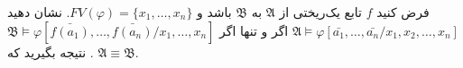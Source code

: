فرض کنید
$f$
تابع یک‌ریختی از 
$\mathfrak{A}$
به 
$\mathfrak{B}$
باشد و 
$FV(\varphi) = \{x_{1},\dots, x_{n}\}$.
نشان دهید
$\mathfrak{A}\models\varphi[\bar{a_1}, \dots, \bar{a_n} / x_{1},x_{2},\dots, x_{n}]$
اگر و تنها اگر 
$\mathfrak{B}\models\varphi[\bar{f(a_1)}, \dots, \bar{f(a_n)} / x_1, \dots, x_n]$.
نتیجه بگیرید که 
$\mathfrak{A}\equiv\mathfrak{B}$.